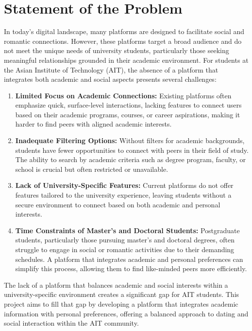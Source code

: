 \section{Statement of the Problem}
    In today's digital landscape, many platforms are designed to facilitate social and romantic connections. However, these platforms target a broad audience and do not meet the unique needs of university students, particularly those seeking meaningful relationships grounded in their academic environment. For students at the Asian Institute of Technology (AIT), the absence of a platform that integrates both academic and social aspects presents several challenges:
    \sloppy
    \begin{enumerate}
        \item \textbf{Limited Focus on Academic Connections:} Existing platforms often emphasize quick, surface-level interactions, lacking features to connect users based on their academic programs, courses, or career aspirations, making it harder to find peers with aligned academic interests.
        
        \item \textbf{Inadequate Filtering Options:} Without filters for academic backgrounds, students have fewer opportunities to connect with peers in their field of study. The ability to search by academic criteria such as degree program, faculty, or school is crucial but often restricted or unavailable.
        
        \item \textbf{Lack of University-Specific Features:} Current platforms do not offer features tailored to the university experience, leaving students without a secure environment to connect based on both academic and personal interests.
        
        \item \textbf{Time Constraints of Master's and Doctoral Students:} Postgraduate students, particularly those pursuing master’s and doctoral degrees, often struggle to engage in social or romantic activities due to their demanding schedules. A platform that integrates academic and personal preferences can simplify this process, allowing them to find like-minded peers more efficiently.
    \end{enumerate}
    
    The lack of a platform that balances academic and social interests within a university-specific environment creates a significant gap for AIT students. This project aims to fill that gap by developing a platform that integrates academic information with personal preferences, offering a balanced approach to dating and social interaction within the AIT community.

